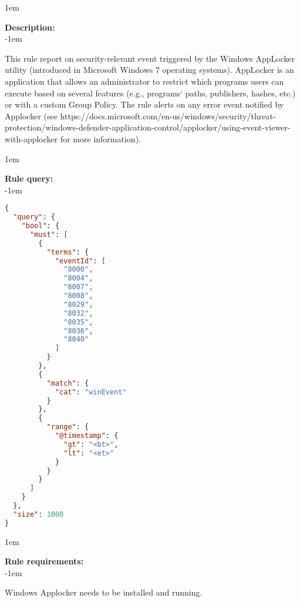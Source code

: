 \openup 1em

{\bf Description:} \\

\openup -1em
\vspace{-2em}


This rule report on security-relevant event triggered by the Windows AppLocker utility (introduced in Microsoft Windows 7 operating systems). AppLocker is an application that allows an administrator to restrict which programs users can execute based on several features (e.g., programs` paths, publishers, hashes, etc.) or with a custom Group Policy. The rule alerts on any error event notified by Applocker (see https://docs.microsoft.com/en-us/windows/security/threat-protection/windows-defender-application-control/applocker/using-event-viewer-with-applocker for more information).

\openup 1em

{\bf Rule query:} \\

\openup -1em
\vspace{-2em}

\begin{lstlisting}[language=json,firstnumber=1]
{
  "query": {
    "bool": {
      "must": [
        {
          "terms": {
            "eventId": [
              "8000",
              "8004",
              "8007",
              "8008",
              "8029",
              "8032",
              "8035",
              "8036",
              "8040"
            ]
          }
        },
        {
          "match": {
            "cat": "winEvent"
          }
        },
        {
          "range": {
            "@timestamp": {
              "gt": "<bt>",
              "lt": "<et>"
            }
          }
        }
      ]
    }
  },
  "size": 1000
}
\end{lstlisting}

\openup 1em

{\bf Rule requirements:} \\

\openup -1em
\vspace{-2em}

Windows Applocker needs to be installed and running.

